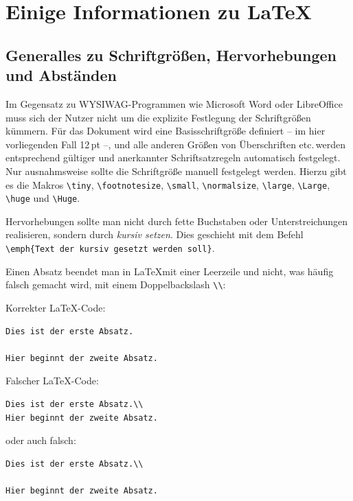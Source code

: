 \documentclass[arbeit=master,oneside,BCOR=12mm]{ArbeitRST}
\begin{document}
\chapter{Einige Informationen zu \LaTeX}

\section{Generalles zu Schriftgrößen, Hervorhebungen und Abständen}
Im Gegensatz zu WYSIWAG-Programmen wie Microsoft Word oder LibreOffice muss sich der Nutzer nicht um die explizite Festlegung der Schriftgrößen kümmern. Für das Dokument wird eine Basisschriftgröße definiert -- im hier vorliegenden Fall 12\,pt --, und alle anderen Größen von Überschriften etc.\,werden entsprechend gültiger und anerkannter Schriftsatzregeln automatisch festgelegt. Nur ausnahmsweise sollte die Schriftgröße manuell festgelegt werden. Hierzu gibt es die Makros \texttt{\textbackslash tiny}, \texttt{\textbackslash footnotesize}, \texttt{\textbackslash small}, \texttt{\textbackslash normalsize}, \texttt{\textbackslash large}, \texttt{\textbackslash Large}, \texttt{\textbackslash huge} und \texttt{\textbackslash Huge}.

Hervorhebungen sollte man nicht durch fette Buchstaben oder Unterstreichungen realisieren, sondern durch \emph{kursiv setzen}. Dies geschieht mit dem Befehl \texttt{\textbackslash emph\{Text der kursiv gesetzt werden soll\}}. 

Einen Absatz beendet man in \LaTeX mit einer Leerzeile und nicht, was häufig falsch gemacht wird, mit einem Doppelbackslash \texttt{\textbackslash \textbackslash}:

\begin{minipage}[t]{0.5\linewidth}
Korrekter \LaTeX-Code:
\begin{verbatim}
Dies ist der erste Absatz.

Hier beginnt der zweite Absatz.
\end{verbatim}
\end{minipage}
\begin{minipage}[t]{0.5\linewidth}
Falscher \LaTeX-Code:
\begin{verbatim}
Dies ist der erste Absatz.\\
Hier beginnt der zweite Absatz.
\end{verbatim}
oder auch falsch:
\begin{verbatim}
Dies ist der erste Absatz.\\

Hier beginnt der zweite Absatz.
\end{verbatim}
\end{minipage}
\end{document}
